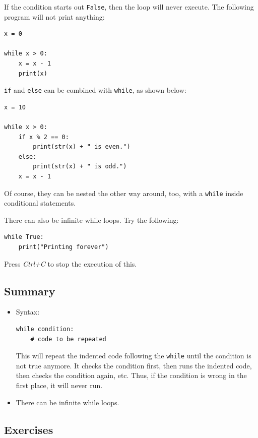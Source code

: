 \documentclass[11pt]{cselabheader}
\begin{document}
If the condition starts out \lstinline{False}, then the loop will never execute.
The following program will not print anything:

\begin{lstlisting}[style=python]
x = 0

while x > 0:
    x = x - 1
    print(x)
\end{lstlisting}

\lstinline{if} and \lstinline{else} can be combined with \lstinline{while}, as
shown below:

\begin{lstlisting}[style=python]
x = 10

while x > 0:
    if x % 2 == 0:
        print(str(x) + " is even.")
    else:
        print(str(x) + " is odd.")
    x = x - 1
\end{lstlisting}

Of course, they can be nested the other way around, too, with a
\lstinline!while! inside conditional statements.

There can also be infinite while loops. Try the following:
\begin{lstlisting}
while True:
    print("Printing forever")
\end{lstlisting}

Press \emph{Ctrl+C} to stop the execution of this.

\subsection{Summary}

\begin{itemize}
  \item Syntax:
    \begin{lstlisting}
while condition:
    # code to be repeated
    \end{lstlisting}

    This will repeat the indented code following the \lstinline!while! until the
    condition is not true anymore. It checks the condition first, then runs the
    indented code, then checks the condition again, etc. Thus, if the condition
    is wrong in the first place, it will never run.

  \item There can be infinite while loops.
\end{itemize}

\subsection{Exercises}
\label{subsec:whileex}
\end{document}

